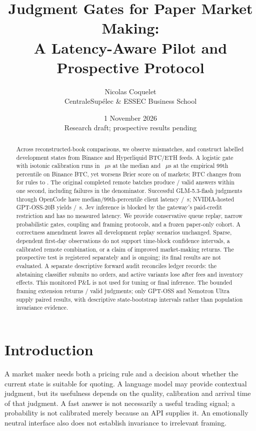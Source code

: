 \documentclass[11pt]{article}
\title{Judgment Gates for Paper Market Making:\\A Latency-Aware Pilot and Prospective Protocol}
\author{Nicolas Coquelet\\CentraleSup\'elec \& ESSEC Business School}
\date{1 November 2026\\\small Research draft; prospective results pending}
\begin{document}
\maketitle

\begin{abstract}
Across \BookComparisons{} reconstructed-book comparisons, we observe \BookErrors{}
mismatches, and construct \StateCount{} labelled development states from Binance
and Hyperliquid BTC/ETH feeds. A logistic gate with isotonic calibration runs in
\LocalMedianUs{}~$\mu$s at the median and \LocalTailUs{}~$\mu$s at the empirical
99th percentile on Binance BTC, yet worsens Brier score on \WorseningMarkets{}
of \MarketCount{} markets; BTC changes from \BtcRuleBrier{} for rules to
\BtcClassBrier{}. The original completed remote batches produce
\RemoteOnTime{}/\RemoteAttempts{} valid answers within one second, including
failures in the denominator. Successful GLM-5.3-flash judgments through OpenCode
have median/99th-percentile client latency \CliGlmMedianS{}/\CliGlmTailS{}~s;
NVIDIA-hosted GPT-OSS-20B yields \GptMedianS{}/\GptTailS{}~s. Jev inference is
blocked by the gateway's paid-credit restriction and has no measured latency.
We provide conservative queue replay, narrow probabilistic gates, coupling and
framing protocols, and a frozen paper-only cohort. A correctness amendment leaves
all \ReplayCount{} development replay scenarios unchanged. Sparse, dependent
first-day observations do not support time-block confidence intervals, a calibrated remote
combination, or a claim of improved market-making returns. The prospective test
is registered separately and is ongoing; its final results are not evaluated.
A separate descriptive forward audit reconciles \AuditedRows{} ledger records:
the abstaining classifier submits no orders, and active variants lose after fees
and inventory effects. This monitored P\&L is not used for tuning or final inference.
The bounded framing extension returns \FramingValid{}/\FramingAttempted{} valid
judgments; only GPT-OSS and Nemotron Ultra supply paired results, with descriptive
state-bootstrap intervals rather than population invariance evidence.
\end{abstract}

\section{Introduction}
A market maker needs both a pricing rule and a decision about whether the current
state is suitable for quoting. A language model may provide contextual judgment,
but its usefulness depends on the quality, calibration and arrival time of that
judgment. A fast answer is not necessarily a useful trading signal; a probability
is not calibrated merely because an API supplies it. An emotionally neutral
interface also does not establish invariance to irrelevant framing.
\end{document}

